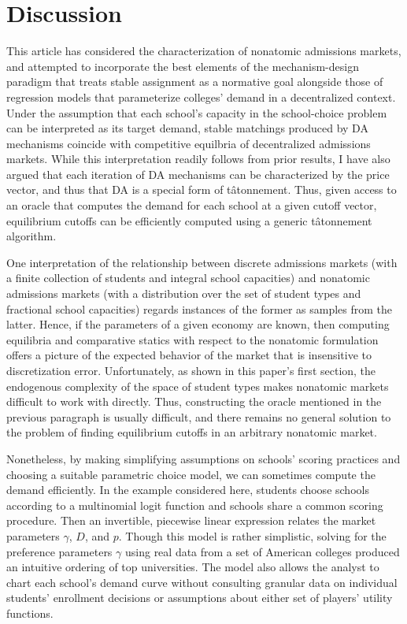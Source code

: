 \documentclass[12pt]{article}
\numberwithin{equation}{subsection}
\theoremstyle{definition}
\begin{document}
\section{Discussion}
This article has considered the characterization of nonatomic admissions markets, and attempted to incorporate the best elements of the mechanism-design paradigm that treats stable assignment as a normative goal alongside those of regression models that parameterize colleges' demand in a decentralized context. Under the assumption that each school's capacity in the school-choice problem can be interpreted as its target demand, stable matchings produced by DA mechanisms coincide with competitive equilbria of decentralized admissions markets. While this interpretation readily follows from prior results, I have also argued that each iteration of DA mechanisms can be characterized by the price vector, and thus that DA is a special form of t\^{a}tonnement. Thus, given access to an oracle that computes the demand for each school at a given cutoff vector, equilibrium cutoffs can be efficiently computed using a generic t\^{a}tonnement algorithm.

One interpretation of the relationship between discrete admissions markets (with a finite collection of students and integral school capacities) and nonatomic admissions markets (with a distribution over the set of student types and fractional school capacities) regards instances of the former as samples from the latter. Hence, if the parameters of a given economy are known, then computing equilibria and comparative statics with respect to the nonatomic formulation offers a picture of the expected behavior of the market that is insensitive to discretization error. Unfortunately, as shown in this paper's first section, the endogenous complexity of the space of student types makes nonatomic markets difficult to work with directly. Thus, constructing the oracle mentioned in the previous paragraph is usually difficult, and there remains no general solution to the problem of finding equilibrium cutoffs in an arbitrary nonatomic market.

Nonetheless, by making simplifying assumptions on schools' scoring practices and choosing a suitable parametric choice model, we can sometimes compute the demand efficiently. In the example considered here, students choose schools according to a multinomial logit function and schools share a common scoring procedure. Then an invertible, piecewise linear expression relates the market parameters $\gamma$, $D$, and $p$. Though this model is rather simplistic, solving for the preference parameters $\gamma$ using real data from a set of American colleges produced an intuitive ordering of top universities. The model also allows the analyst to chart each school's demand curve without consulting granular data on individual students' enrollment decisions or assumptions about either set of players' utility functions. 
\end{document}
